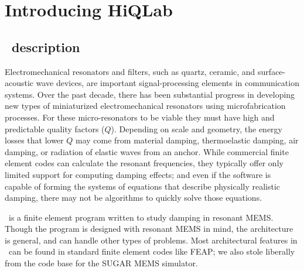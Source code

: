 \section{Introducing HiQLab}

\subsection{\hiq\ description}

Electromechanical resonators and filters, such as quartz, ceramic, and
surface-acoustic wave devices, are important signal-processing
elements in communication systems.  Over the past decade, there has
been substantial progress in developing new types of miniaturized
electromechanical resonators using microfabrication processes.  For
these micro-resonators to be viable they must have high and
predictable quality factors ($Q$).  Depending on scale and geometry,
the energy losses that lower $Q$ may come from material damping,
thermoelastic damping, air damping, or radiation of elastic waves from
an anchor.  While commercial finite element codes can calculate the
resonant frequencies, they typically offer only limited support for
computing damping effects; and even if the software is capable of
forming the systems of equations that describe physically realistic
damping, there may not be algorithms to quickly solve those equations.

\hiq\ is a finite element program written to study damping in resonant
MEMS.  Though the program is designed with resonant MEMS in mind, the
architecture is general, and can handle other types of problems.  Most
architectural features in \hiq\ can be found in standard finite
element codes like FEAP; we also stole liberally from the code base
for the SUGAR MEMS simulator.

